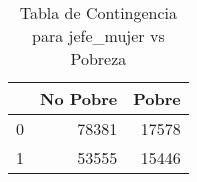 \begin{table}[ht]
\centering
\begin{tabular}{rrr}
  \toprule
 & No Pobre & Pobre \\ 
  \midrule
0 & 78381 & 17578 \\ 
  1 & 53555 & 15446 \\ 
   \bottomrule
\end{tabular}
\caption{Tabla de Contingencia para jefe_mujer vs Pobreza} 
\label{tab:contingency_jefe_mujer}
\end{table}
